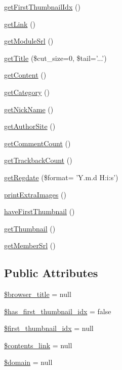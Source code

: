 \begin{DoxyCompactItemize}
\item 
\hyperlink{classmcontentItem_acb7e5ab4fbeac716585618eba64960aa}{get\-First\-Thumbnail\-Idx} ()
\item 
\hyperlink{classmcontentItem_a5a2cad58644aabb016942e427998f32c}{get\-Link} ()
\item 
\hyperlink{classmcontentItem_a9b9841e39ff3ee331679270f9e075203}{get\-Module\-Srl} ()
\item 
\hyperlink{classmcontentItem_a180633138fb77537e7da900074aa7454}{get\-Title} (\$cut\-\_\-size=0, \$tail='...')
\item 
\hyperlink{classmcontentItem_a19b333e6ff14db6f7f77c3f94471bdff}{get\-Content} ()
\item 
\hyperlink{classmcontentItem_ae8d1d6e76cc1cfa79d544d47acaedbcc}{get\-Category} ()
\item 
\hyperlink{classmcontentItem_a8182db3f99934760d5f52082b233a1cb}{get\-Nick\-Name} ()
\item 
\hyperlink{classmcontentItem_a90fc323e4d3cf2661e6af5e51babd05f}{get\-Author\-Site} ()
\item 
\hyperlink{classmcontentItem_ac60221ec5be0a8158c5248c09efd8fb1}{get\-Comment\-Count} ()
\item 
\hyperlink{classmcontentItem_afb955c421fa34f36c51edd795d3a00c7}{get\-Trackback\-Count} ()
\item 
\hyperlink{classmcontentItem_a9f7a6c2fc454c1d7e7524504141f3fc1}{get\-Regdate} (\$format= 'Y.\-m.\-d H\-:i\-:s')
\item 
\hyperlink{classmcontentItem_a0cd7ac4bbaf7e7561f5597920c691f9d}{print\-Extra\-Images} ()
\item 
\hyperlink{classmcontentItem_ac8b5fb3d84cdc8a96a8c02e9472e25dd}{have\-First\-Thumbnail} ()
\item 
\hyperlink{classmcontentItem_a25e5c63dceabc33afe0b5ce5b3ddafcf}{get\-Thumbnail} ()
\item 
\hyperlink{classmcontentItem_ab7ad6741a93ab7d631f78bf1253f6800}{get\-Member\-Srl} ()
\end{DoxyCompactItemize}
\subsection*{Public Attributes}
\begin{DoxyCompactItemize}
\item 
\hyperlink{classmcontentItem_afdef241bedb2d1829475b7bb623cecf7}{\$browser\-\_\-title} = null
\item 
\hyperlink{classmcontentItem_a8c95afa6c7bcad64626c9f343e77cdd4}{\$has\-\_\-first\-\_\-thumbnail\-\_\-idx} = false
\item 
\hyperlink{classmcontentItem_a358e826e3ee863300d43b12a8218a5fa}{\$first\-\_\-thumbnail\-\_\-idx} = null
\item 
\hyperlink{classmcontentItem_afdee32faf59897fa7e02f9ed4389b411}{\$contents\-\_\-link} = null
\item 
\hyperlink{classmcontentItem_ad92b662d98d23cb2a10747de7ffdada0}{\$domain} = null
\end{DoxyCompactItemize}


